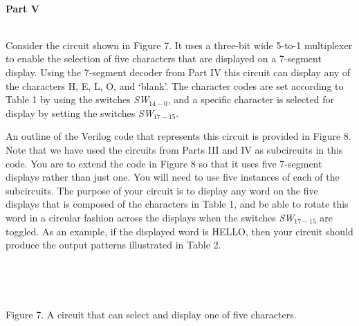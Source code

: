 \documentclass[psfig,10pt,fullpage]{article}
\begin{document}
~\\
\noindent
{\bf Part V}

~\\
\noindent
Consider the circuit shown in Figure 7. It uses a three-bit wide 5-to-1 multiplexer to
enable the selection of five characters that are displayed on a 7-segment display. Using the
7-segment decoder from Part IV this circuit can display any of the characters H, E, L, O,
and `blank'. The character codes are set according to Table 1 by using the switches 
{\it SW}$_{14-0}$, and a specific character is selected for display by setting the
switches {\it SW}$_{17-15}$.

An outline of the Verilog code that represents this circuit is 
provided in Figure 8. Note that we have
used the circuits from Parts III and IV as subcircuits in this code. You are to
extend the code in Figure 8 so that it uses five 7-segment displays rather than just one.
You will need to use five instances of each of the subcircuits. The
purpose of your circuit is to display any word on the five displays that is composed of the
characters in Table 1, and be able to rotate this word in a circular fashion across the
displays when the switches {\it SW}$_{17-15}$ are toggled. As an example,
if the displayed word is HELLO, then your circuit should produce the output patterns
illustrated in Table 2.

~\\
\begin{figure}[H]
\scriptsize
\centerline{
\hbox{}}
\end{figure}
~\\
\centerline{Figure 7.  A circuit that can select and display one of five characters.}
~\\
\end{document}
